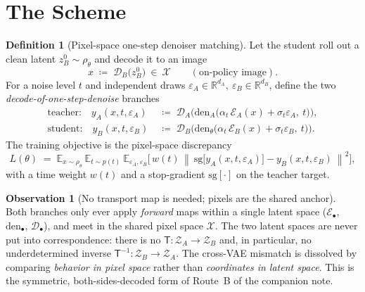 \documentclass[11pt,a4paper]{article}
\newcommand{\E}{\mathbb{E}}
\newcommand{\R}{\mathbb{R}}
\newcommand{\sg}{\mathrm{sg}}
\newcommand{\Xspace}{\mathcal{X}}
\newcommand{\Za}{\mathcal{Z}_{A}}
\newcommand{\Zb}{\mathcal{Z}_{B}}
\newcommand{\Enc}{\mathcal{E}}
\newcommand{\Dec}{\mathcal{D}}
\newcommand{\den}{\mathrm{den}}
\newcommand{\norm}[1]{\left\lVert #1 \right\rVert}
\theoremstyle{definition}
\newtheorem{definition}{Definition}
\newtheorem{observation}{Observation}
\begin{document}
\section{The Scheme}
\label{sec:scheme}

\begin{definition}[Pixel-space one-step denoiser matching]
\label{def:scheme}
Let the student roll out a clean latent $z_B^{0}\sim\rho_\theta$ and decode it to an image
\begin{equation}
x\;\coloneqq\;\Dec_B\big(z_B^{0}\big)\ \in\ \Xspace \qquad(\text{on-policy image}).
\label{eq:img}
\end{equation}
For a noise level $t$ and independent draws $\varepsilon_A\in\R^{d_A},\ \varepsilon_B\in\R^{d_B}$,
define the two \emph{decode-of-one-step-denoise} branches
\begin{align}
\text{teacher:}\quad
y_A(x,t,\varepsilon_A)&\;\coloneqq\;\Dec_A\!\Big(\den_A\big(\alpha_t\,\Enc_A(x)+\sigma_t\varepsilon_A,\ t\big)\Big),
\label{eq:yA}\\
\text{student:}\quad
y_B(x,t,\varepsilon_B)&\;\coloneqq\;\Dec_B\!\Big(\den_\theta\big(\alpha_t\,\Enc_B(x)+\sigma_t\varepsilon_B,\ t\big)\Big).
\label{eq:yB}
\end{align}
The training objective is the pixel-space discrepancy
\begin{equation}
L(\theta)\;=\;\E_{x\sim\rho_\theta}\ \E_{t\sim p(t)}\ \E_{\varepsilon_A,\varepsilon_B}\Big[\,w(t)\,
\norm{\ \sg\!\big[y_A(x,t,\varepsilon_A)\big]-y_B(x,t,\varepsilon_B)\ }^2\Big],
\label{eq:loss}
\end{equation}
with a time weight $w(t)$ and a stop-gradient $\sg[\cdot]$ on the teacher target.
\end{definition}

\begin{observation}[No transport map is needed; pixels are the shared anchor]
\label{obs:no-transport}
Both branches only ever apply \emph{forward} maps within a single latent space
($\Enc_\bullet$, $\den_\bullet$, $\Dec_\bullet$), and meet in the shared pixel space $\Xspace$.
The two latent spaces are never put into correspondence: there is no $\mathsf{T}:\Za\to\Zb$ and,
in particular, no underdetermined inverse $\mathsf{T}^{-1}:\Zb\to\Za$. The cross-VAE mismatch is
dissolved by comparing \emph{behavior in pixel space} rather than \emph{coordinates in latent
space}. This is the symmetric, both-sides-decoded form of Route~B of the companion note.
\end{observation}
\end{document}
